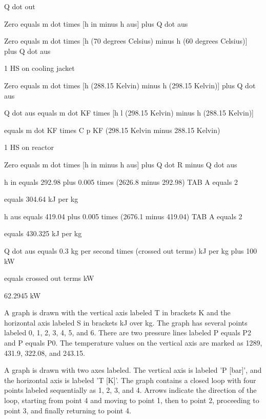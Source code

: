 Q dot out

Zero equals m dot times [h in minus h aus] plus Q dot aus

Zero equals m dot times [h (70 degrees Celsius) minus h (60 degrees Celsius)] plus Q dot aus

1 HS on cooling jacket

Zero equals m dot times [h (288.15 Kelvin) minus h (298.15 Kelvin)] plus Q dot aus

Q dot aus equals m dot KF times [h l (298.15 Kelvin) minus h (288.15 Kelvin)]

equals m dot KF times C p KF (298.15 Kelvin minus 288.15 Kelvin)

1 HS on reactor

Zero equals m dot times [h in minus h aus] plus Q dot R minus Q dot aus

h in equals 292.98 plus 0.005 times (2626.8 minus 292.98) TAB A equals 2

equals 304.64 kJ per kg

h aus equals 419.04 plus 0.005 times (2676.1 minus 419.04) TAB A equals 2

equals 430.325 kJ per kg

Q dot aus equals 0.3 kg per second times (crossed out terms) kJ per kg plus 100 kW

equals crossed out terms kW

62.2945 kW

A graph is drawn with the vertical axis labeled T in brackets K and the horizontal axis labeled S in brackets kJ over kg. The graph has several points labeled 0, 1, 2, 3, 4, 5, and 6. There are two pressure lines labeled P equals P2 and P equals P0. The temperature values on the vertical axis are marked as 1289, 431.9, 322.08, and 243.15.

A graph is drawn with two axes labeled. The vertical axis is labeled 'P [bar]', and the horizontal axis is labeled 'T [K]'. The graph contains a closed loop with four points labeled sequentially as 1, 2, 3, and 4. Arrows indicate the direction of the loop, starting from point 4 and moving to point 1, then to point 2, proceeding to point 3, and finally returning to point 4.